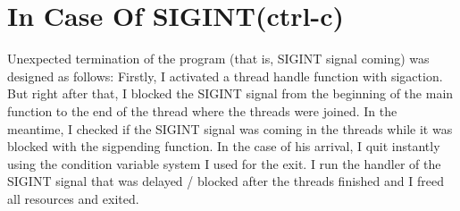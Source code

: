 \documentclass{article}
\begin{document}
\section{In Case Of SIGINT(ctrl-c)}
\par{Unexpected termination of the program (that is, SIGINT signal coming) was designed as follows: Firstly, I activated a thread handle function with sigaction. But right after that, I blocked the SIGINT signal from the beginning of the main function to the end of the thread where the threads were joined. In the meantime, I checked if the SIGINT signal was coming in the threads while it was blocked with the sigpending function. In the case of his arrival, I quit instantly using the condition variable system I used for the exit. I run the handler of the SIGINT signal that was delayed / blocked after the threads finished and I freed all resources and exited.}

\newpage
\end{document}
